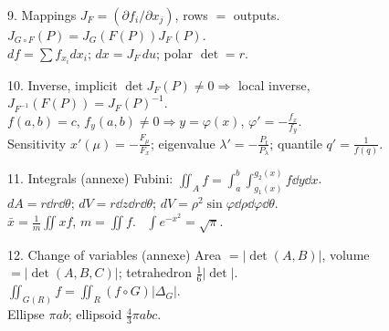 \begin{tcbraster}[raster columns=2, raster equal height=rows, raster column skip=3mm, raster row skip=3mm]
\begin{fsheet}{9. Mappings}
$J_F=(\partial f_i/\partial x_j)$, rows $=$ outputs.\\
$J_{G\circ F}(P)=J_G(F(P))J_F(P)$.\\
$df=\sum f_{x_i}dx_i$; $dx=J_F\,du$; polar $\det=r$.
\end{fsheet}
\begin{fsheet}{10. Inverse, implicit}
$\det J_F(P)\ne0\Rightarrow$ local inverse, $J_{F^{-1}}(F(P))=J_F(P)^{-1}$.\\
$f(a,b)=c$, $f_y(a,b)\ne0\Rightarrow y=\varphi(x)$, $\varphi'=-\frac{f_x}{f_y}$.\\
Sensitivity $x'(\mu)=-\frac{F_\mu}{F_x}$; eigenvalue $\lambda'=-\frac{P_t}{P_\lambda}$; quantile $q'=\frac1{f(q)}$.
\end{fsheet}
\begin{fsheet}{11. Integrals (annexe)}
Fubini: $\iint_A f=\int_a^b\int_{g_1(x)}^{g_2(x)}f\dd y\dd x$.\\
$dA=r\dd r\dd\theta$; $dV=r\dd z\dd r\dd\theta$; $dV=\rho^2\sin\varphi\dd\rho\dd\varphi\dd\theta$.\\
$\bar x=\frac1m\iint xf$, $m=\iint f$. \ $\int e^{-x^2}=\sqrt\pi$.
\end{fsheet}
\begin{fsheet}{12. Change of variables (annexe)}
Area $=|\det(A,B)|$, volume $=|\det(A,B,C)|$; tetrahedron $\frac16|\det|$.\\
$\iint_{G(R)}f=\iint_R(f\circ G)|\Delta_G|$.\\
Ellipse $\pi ab$; ellipsoid $\frac43\pi abc$.
\end{fsheet}
\end{tcbraster}
